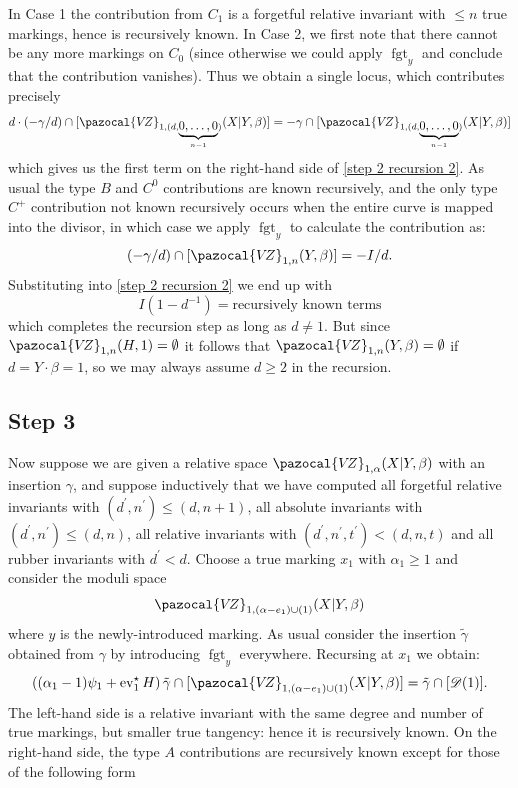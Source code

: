 \documentclass[11pt]{amsart}
\newcommand{\VZ}{\pazocal{V\!Z}}
\newcommand{\st}{\star}
\newcommand{\ev}{\operatorname{ev}}
\newcommand{\fgt}{\operatorname{fgt}}
\newcommand{\Dcal}{\mathcal{D}}
\theoremstyle{definition}
\theoremstyle{definition}
\begin{document}
In Case 1 the contribution from $C_1$ is a forgetful relative invariant with $\leq n$ true markings, hence is recursively known. In Case 2, we first note that there cannot be any more markings on $C_0$ (since otherwise we could apply $\fgt_y$ and conclude that the contribution vanishes). Thus we obtain a single locus, which contributes precisely
\begin{equation*} d\cdot(-\gamma/d) \cap [\VZ_{1,(d,\underbrace{0,\ldots,0}_{n-1})}(X|Y,\beta)] = -\gamma\cap[\VZ_{1,(d,\underbrace{0,\ldots,0}_{n-1})}(X|Y,\beta)]\end{equation*}
which gives us the first term on the right-hand side of \eqref{step 2 recursion 2}. As usual the type $B$ and $C^0$ contributions are known recursively, and the only type $C^+$ contribution not known recursively occurs when the entire curve is mapped into the divisor, in which case we apply $\fgt_y$ to calculate the contribution as:
\begin{equation*} (-\gamma/d) \cap [\VZ_{1,n}(Y,\beta)] = -I/d.\end{equation*}
Substituting into \eqref{step 2 recursion 2} we end up with
\begin{equation*} I(1-d^{-1}) = \text{recursively known terms} \end{equation*}
which completes the recursion step as long as $d \neq 1$. But since $\VZ_{1,n}(H,1)=\emptyset$ it follows that $\VZ_{1,n}(Y,\beta)=\emptyset$ if $d=Y\cdot\beta=1$, so we may always assume $d \geq 2$ in the recursion.

\subsection*{Step 3} Now suppose we are given a relative space $\VZ_{1,\alpha}(X|Y,\beta)$ with an insertion $\gamma$, and suppose inductively that we have computed all forgetful relative invariants with $(d^\prime,n^\prime) \leq (d,n+1)$, all absolute invariants with $(d^\prime,n^\prime) \leq (d,n)$, all relative invariants with $(d^\prime,n^\prime,t^\prime)<(d,n,t)$ and all rubber invariants with $d^\prime < d$. Choose a true marking $x_1$ with $\alpha_1 \geq 1$ and consider the moduli space
\begin{equation*} \VZ_{1,(\alpha-e_1)\cup(1)}(X|Y,\beta) \end{equation*}
where $y$ is the newly-introduced marking. As usual consider the insertion $\tilde\gamma$ obtained from $\gamma$ by introducing $\fgt_y$ everywhere. Recursing at $x_1$ we obtain:
\begin{equation*} \left( (\alpha_1-1)\psi_1 + \ev_1^\st H\right) \tilde\gamma \cap [\VZ_{1,(\alpha-e_1)\cup(1)}(X|Y,\beta)] = \tilde\gamma \cap [\Dcal(1)].\end{equation*}
The left-hand side is a relative invariant with the same degree and number of true markings, but smaller true tangency: hence it is recursively known. On the right-hand side, the type $A$ contributions are recursively known except for those of the following form
\end{document}
